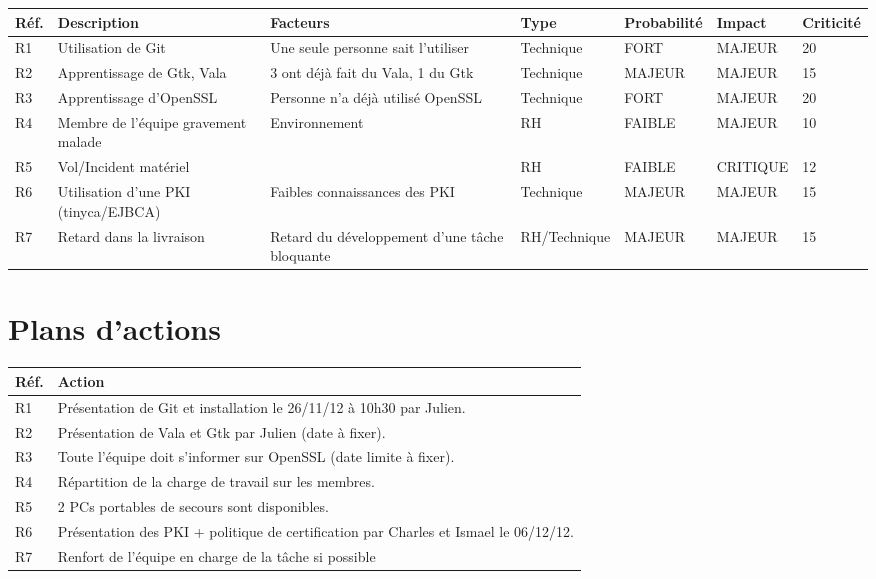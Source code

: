 \documentclass[a4paper,11pt,french]{article}
\begin{document}
\begin{center}
\begin{tabular}{|l|p{2.5cm}|p{2.5cm}|l|l|l|l|}
\hline
\textbf{Réf.} & \textbf{Description} & \textbf{Facteurs} & \textbf{Type} & \textbf{Probabilité} & \textbf{Impact} & \textbf{Criticité} \\
\hline
R1&Utilisation de Git&Une seule personne sait l'utiliser&Technique&FORT&MAJEUR&20\\
\hline
R2&Apprentissage de Gtk, Vala&3 ont déjà fait du Vala, 1 du Gtk&Technique&MAJEUR&MAJEUR&15\\
\hline
R3&Apprentissage d'OpenSSL&Personne n'a déjà utilisé OpenSSL&Technique&FORT&MAJEUR&20\\
\hline
R4&Membre de l'équipe gravement malade&Environnement&RH&FAIBLE&MAJEUR&10\\
\hline
R5&Vol/Incident matériel&&RH&FAIBLE&CRITIQUE&12\\
\hline
R6&Utilisation d'une PKI (tinyca/EJBCA)&Faibles connaissances des PKI&Technique&MAJEUR&MAJEUR&15\\
\hline
R7 & Retard dans la livraison & Retard du développement d'une tâche bloquante & RH/Technique & MAJEUR & MAJEUR & 15\\
\hline
\end{tabular}
\end{center}

\section{Plans d'actions}
\begin{center}
\begin{tabular}{|l|l|}
\hline
\textbf{Réf.}&\textbf{Action}\\
\hline
R1&Présentation de Git et installation le 26/11/12 à 10h30 par Julien.\\
\hline
R2&Présentation de Vala et Gtk par Julien (date à fixer).\\
\hline
R3&Toute l'équipe doit s'informer sur OpenSSL (date limite à fixer).\\
\hline
R4&Répartition de la charge de travail sur les membres.\\
\hline
R5&2 PCs portables de secours sont disponibles.\\
\hline
R6&Présentation des PKI + politique de certification par Charles et Ismael le 06/12/12.\\
\hline
R7& Renfort de l'équipe en charge de la tâche si possible\\
\hline
\end{tabular}
\end{center}
\end{document}

